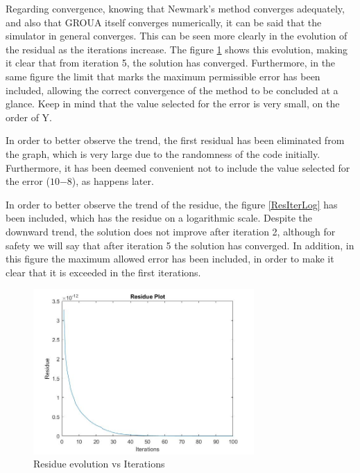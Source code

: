 \documentclass[a4paper, 10pt]{article}
\begin{document}

Regarding convergence, knowing that Newmark's method converges adequately, and also that GROUA itself converges numerically, it can be said that the simulator in general converges. This can be seen more clearly in the evolution of the residual as the iterations increase. The figure \ref{ResIter} shows this evolution, making it clear that from iteration 5, the solution has converged. Furthermore, in the same figure the limit that marks the maximum permissible error has been included, allowing the correct convergence of the method to be concluded at a glance. Keep in mind that the value selected for the error is very small, on the order of Y.

In order to better observe the trend, the first residual has been eliminated from the graph, which is very large due to the randomness of the code initially. Furthermore, it has been deemed convenient not to include the value selected for the error ($ 10{-8}$), as happens later.

In order to better observe the trend of the residue, the figure \ref{ResIterLog} has been included, which has the residue on a logarithmic scale. Despite the downward trend, the solution does not improve after iteration 2, although for safety we will say that after iteration 5 the solution has converged. In addition, in this figure the maximum allowed error has been included, in order to make it clear that it is exceeded in the first iterations.

\begin{figure}
\centering
\includegraphics[width=0.75\textwidth]{ResIter}
\caption{Residue evolution vs Iterations } 
\label{ResIter}
\end{figure}
\end{document}
